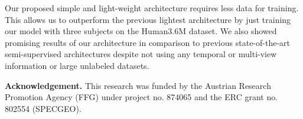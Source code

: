 \documentclass[runningheads]{llncs}
\begin{document}
Our proposed simple and light-weight architecture requires less data for training. This allows us to outperform the previous lightest architecture by just training our model with three subjects on the Human3.6M dataset. We also showed promising results of our architecture in comparison to previous state-of-the-art semi-supervised architectures despite not using any temporal or multi-view information or large unlabeled datasets.

\textbf{Acknowledgement.} This research was funded by the Austrian Research Promotion Agency (FFG) under project no. 874065 and the ERC grant no. 802554 (SPECGEO).
\renewcommand{\bibname}{\leftline{References}}

\end{document}
